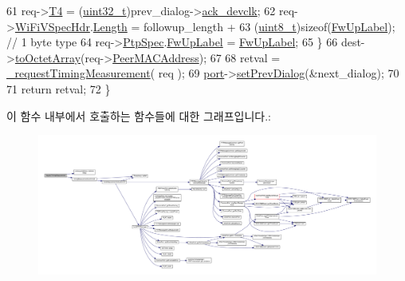 \begin{DoxyCode}
61         req->\hyperlink{struct___t_i_m_i_n_g_m_s_m_t___r_e_q_u_e_s_t_a4d070c49c8120152ba5cf1a5bc9c2b8b}{T4} = (\hyperlink{parse_8c_a6eb1e68cc391dd753bc8ce896dbb8315}{uint32\_t})prev\_dialog->\hyperlink{class_wireless_dialog_a0d8bfa01dba56ce17e8d98de7c99fd0a}{ack\_devclk};
62         req->\hyperlink{struct___t_i_m_i_n_g_m_s_m_t___r_e_q_u_e_s_t_a833245209a0ea1388cc5eda2f9aacf4d}{WiFiVSpecHdr}.\hyperlink{struct___w_i_f_i___v_e_n_d_o_r___s_p_e_c___h_d_r_a2b1ba85fe7425ab62c629e2d39646b24}{Length} = followup\_length +
63             (\hyperlink{stdint_8h_aba7bc1797add20fe3efdf37ced1182c5}{uint8\_t})\textcolor{keyword}{sizeof}(\hyperlink{wireless__tstamper_8hpp_a5a8256a2e4df095d39339b9650bd0391}{FwUpLabel}); \textcolor{comment}{// 1 byte type}
64         req->\hyperlink{struct___t_i_m_i_n_g_m_s_m_t___r_e_q_u_e_s_t_aac5b14c9395b4892cd4b00b447726287}{PtpSpec}.\hyperlink{struct___p_t_p___s_p_e_c_a3180b75542044fab6e7b486623f9e8b9}{FwUpLabel} = \hyperlink{wireless__tstamper_8hpp_a5a8256a2e4df095d39339b9650bd0391}{FwUpLabel};
65     \}
66     dest->\hyperlink{class_link_layer_address_a1e2896b540d2ea6182d351332737db91}{toOctetArray}(req->\hyperlink{struct___t_i_m_i_n_g_m_s_m_t___r_e_q_u_e_s_t_a08d9c385ed7bbc6dd95bd8dedb74d8c1}{PeerMACAddress});
67 
68     retval = \hyperlink{class_wireless_timestamper_a7834328127f7bb27d200da470053a343}{\_requestTimingMeasurement}( req );
69     \hyperlink{class_wireless_timestamper_a16e2f76ce8715713c1d3db843c27d2d3}{port}->\hyperlink{class_wireless_port_a30565b46f08e3140cfd988e7dab46589}{setPrevDialog}(&next\_dialog);
70 
71     \textcolor{keywordflow}{return} retval;
72 \}
\end{DoxyCode}


이 함수 내부에서 호출하는 함수들에 대한 그래프입니다.\+:
\nopagebreak
\begin{figure}[H]
\begin{center}
\leavevmode
\includegraphics[width=350pt]{class_wireless_timestamper_a7647a2952736825775d90d6d5c5dca76_cgraph}
\end{center}
\end{figure}





